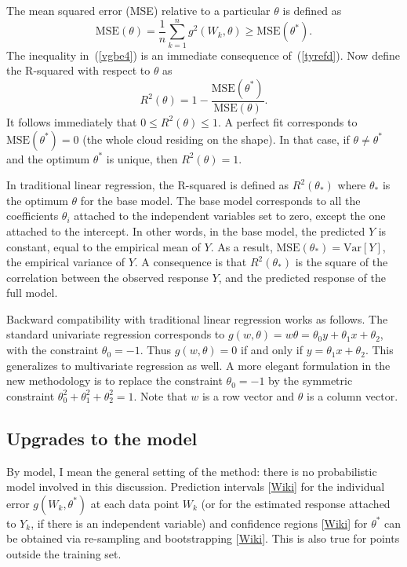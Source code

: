 \documentclass[oneside,10pt]{book}
\begin{document}
\noindent The \textcolor{index}{mean squared error} (MSE) relative to a particular $\theta$ is defined as  
\begin{equation}
\text{MSE}(\theta)=\frac{1}{n}\sum_{k=1}^n g^2(W_k,\theta) \geq \text{MSE}(\theta^*). \label{vgbe4} 
\end{equation}
The inequality in~(\ref{vgbe4})  is an immediate consequence of~(\ref{tyrefd}). Now define the 
 \textcolor{index}{R-squared}
 with respect to 
 $\theta$ as 
\begin{equation}
R^2(\theta)=1 - \frac{\text{MSE}(\theta^*)}{\text{MSE}(\theta)}. \label{rsqwa}
\end{equation}
It follows immediately that $0\leq R^2(\theta)\leq 1$. A perfect fit corresponds to $\text{MSE}(\theta^*)=0$ (the whole cloud residing on the shape). In that case,  if $\theta\neq \theta^*$ and the optimum $\theta^*$ is unique, then $R^2(\theta)=1$.

In traditional linear regression, the R-squared is defined as $R^2(\theta_*)$ where $\theta_*$ is the optimum $\theta$ for the base model. 
The base model corresponds to all the coefficients $\theta_i$ attached to the independent variables set to zero, except the one attached to the intercept. In other words, in the base model, the predicted $Y$ is constant, equal to the empirical mean of $Y$. As a result,  $\text{MSE}(\theta_*)=\text{Var}[Y]$, the empirical variance of $Y$. A consequence is that $R^2(\theta_*)$ is the square of the
 correlation between the observed response $Y$, and the predicted response of the full model. 


Backward compatibility with traditional linear regression works as follows. The standard univariate regression corresponds to 
$g(w,\theta) = w \theta =\theta_0 y +\theta_1 x + \theta_2$, with the constraint $\theta_0=-1$.  Thus $g(w,\theta)=0$ if and only if
 $y= \theta_1 x + \theta_2$. This generalizes to multivariate regression as well.
A more elegant formulation in the new methodology is to replace the constraint $\theta_0=-1$ by the symmetric constraint $\theta_0^2+\theta_1^2+\theta_2^2=1$. 
 Note that $w$ is a row vector and $\theta$ is a column vector. 

\subsection{Upgrades to the model}

By model, I mean the general setting of the method: there is no probabilistic model involved in this discussion. 
\textcolor{index}{Prediction intervals} [\href{https://en.wikipedia.org/wiki/Prediction_interval}{Wiki}] for the individual error $g(W_k,\theta^*)$ at each data point $W_k$ (or for the estimated response attached to $Y_k$, if there is an independent variable) and 
 \textcolor{index}{confidence regions} [\href{https://en.wikipedia.org/wiki/Confidence_region}{Wiki}] for $\theta^*$ can be obtained via re-sampling and \textcolor{index}{bootstrapping} [\href{https://en.wikipedia.org/wiki/Bootstrapping_(statistics)}{Wiki}]. This is also true for points outside the training set. 
\end{document}
